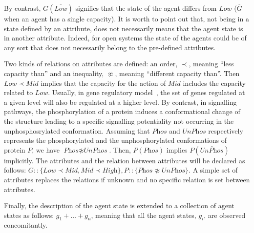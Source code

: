 \documentclass{eptcs}
\newcounter{ti}
\begin{document}
By contrast, $G(\overline{\textit{Low}})$ signifies that the state of the agent differs from $\mathit{Low}$ ($\overline G$ when an agent has a single capacity). It is worth to point out that, not being in a state defined by an attribute, does not necessarily means that the agent state is in another attribute. Indeed, for open systems the state of the agents could be of any sort that does not necessarily belong to the pre-defined attributes. 

 Two kinds of relations on attributes are defined: an order, $\prec$, meaning ``less capacity than'' and an inequality, $\napprox$, meaning ``different capacity than''. Then $\mathit{Low} \prec \mathit{Mid}$ implies that the capacity for the action of $\mathit{Mid}$ includes the capacity related to $ \mathit{Low}$. Usually, in gene regulatory model~\cite{Delaplace2010}, the set of genes regulated at a given level will also be regulated at a higher level. By contrast, in signalling pathways, the phosphorylation of a protein induces a conformational change of the structure leading to a specific signalling potentiality not occurring in the unphosphosrylated conformation. Assuming that $\textit{Phos}$ and $\textit{UnPhos}$ respectively represents the phosphorylated and the unphosphorylated conformations of protein $P$, we have $\textit{Phos} \napprox \textit{UnPhos}$. Then, $P(\textit{Phos})$ implies $P(\overline{\textit{UnPhos}})$ implicitly. The attributes and the relation between attributes will be declared as follows:
$
 G :: \{\textit{Low} \prec \textit{Mid}, \textit{Mid} \prec \textit{High} \},
 P :: \{ \textit{Phos} \napprox \textit{UnPhos} \}.$
A simple set of attributes replaces the relations if unknown and no specific relation is set between attributes.

Finally, the description of the agent state is extended to a collection of agent states as follows: $g_1 + \ldots + g_n$, meaning that all the agent states, $g_i$, are observed concomitantly.
\end{document}

